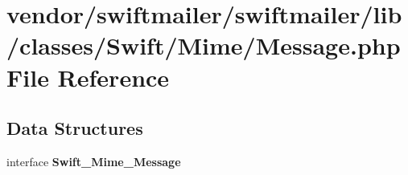 \section{vendor/swiftmailer/swiftmailer/lib/classes/\+Swift/\+Mime/\+Message.php File Reference}
\label{swiftmailer_2swiftmailer_2lib_2classes_2_swift_2_mime_2_message_8php}
\subsection*{Data Structures}
\begin{DoxyCompactItemize}
\item 
interface {\bf Swift\+\_\+\+Mime\+\_\+\+Message}
\end{DoxyCompactItemize}
